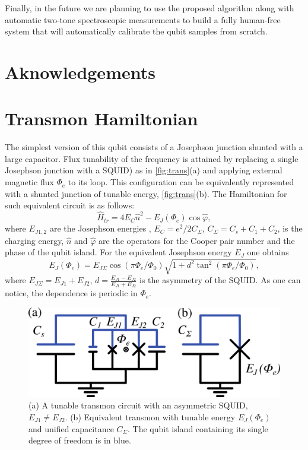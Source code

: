 \documentclass[%
 aip,
 draft,
 amsmath,amssymb,
 reprint,%
]{revtex4-1}
\begin{document}
Finally, in the future we are planning to use the proposed algorithm along with automatic two-tone spectroscopic measurements to build a fully human-free system that will automatically calibrate the qubit samples from scratch.


\section{Aknowledgements}


\appendix



\section{Transmon Hamiltonian}\label{sec:transmon}

The simplest version of this qubit consists of a Josephson junction shunted with a large capacitor. Flux tunability of the frequency is attained by replacing a single Josephson junction with a SQUID) as in \autoref{fig:trans}(a) and applying external magnetic flux $\Phi_e$ to its loop. This configuration can be equivalently represented with a shunted junction of tunable energy, \autoref{fig:trans}(b). The Hamiltonian for such equivalent circuit is as follows: 
\begin{equation}
\hat{H}_{tr} = 4E_C \hat n^2 - E_J(\Phi_e) \cos \hat\varphi,
\label{eq:tr_ham}
\end{equation}
where $E_{J1,2}$ are the Josephson energies , $E_C = e^2/2C_{\Sigma}$, $C_{\Sigma} = C_s + C_1 +C_2$, is the charging energy, $\hat n$ and $\hat \varphi$ are the operators for the Cooper pair number and the phase of the qubit island. For the equivalent Josephson energy $E_{J}$ one obtains
\begin{equation}
E_{J}(\Phi_e) = E_{J\Sigma}\cos\left(\pi \Phi_e/\Phi_0\right) \sqrt{1+d^2 \tan^2 \left(\pi \Phi_e/\Phi_0\right)},
\label{eq:EJ_Phie}
\end{equation}  
where $E_{J\Sigma} = E_{J1}+E_{J2}$, $d = \frac{E_{J1}-E_{J2}}{E_{J1}+E_{J2}}$ is the asymmetry of the SQUID. As one can notice, the dependence is periodic in $\Phi_e$.
\begin{figure}[b]
	\centering
	\includegraphics[width=\linewidth]{transmon}
	\caption{(a) A tunable transmon circuit with an asymmetric SQUID, $E_{J1} \neq E_{J2}$. (b) Equivalent transmon with tunable energy $E_{J}(\Phi_e)$ and unified capacitance $C_{\Sigma}$. The qubit island containing its single degree of freedom is in blue.}
	\label{fig:trans}
\end{figure}
\end{document}
